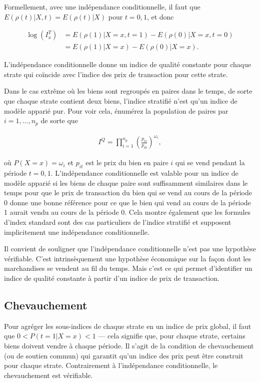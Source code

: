 \documentclass[
]{article}
\begin{document}
Formellement, avec une indépendance conditionnelle, il faut que \(E(\rho(t) | X, t) = E(\rho(t) | X)\) pour \(t = 0,1\), et donc

\begin{align*}
\log (I^{T}_{x}) &= E(\rho(1) | X = x, t = 1) - E(\rho(0) | X = x, t = 0) \\
 &= E(\rho(1) | X = x) - E(\rho(0) | X = x).
\end{align*}

L'indépendance conditionnelle donne un indice de qualité constante pour chaque strate qui coïncide avec l'indice des prix de transaction pour cette strate.

Dans le cas extrême où les biens sont regroupés en paires dans le temps, de sorte que chaque strate contient deux biens, l'indice stratifié n'est qu'un indice de modèle apparié pur. Pour voir cela, énumérez la population de paires par \(i = 1, \ldots, n_{p}\) de sorte que

\begin{align*}
I^{Q} = \prod_{i = 1}^{n_{p}} \left(\frac{p_{i1}}{p_{i0}} \right)^{\omega_{i}},
\end{align*}

où \(P(X = x) = \omega_{i}\) et \(p_{it}\) est le prix du bien en paire \(i\) qui se vend pendant la période \(t = 0,1\). L'indépendance conditionnelle est valable pour un indice de modèle apparié si les biens de chaque paire sont suffisamment similaires dans le temps pour que le prix de transaction du bien qui se vend au cours de la période 0 donne une bonne référence pour ce que le bien qui vend au cours de la période 1 aurait vendu au cours de la période 0. Cela montre également que les formules d'index standard sont des cas particuliers de l'indice stratifié et supposent implicitement une indépendance conditionnelle.

Il convient de souligner que l'indépendance conditionnelle n'est pas une hypothèse vérifiable. C'est intrinsèquement une hypothèse économique sur la façon dont les marchandises se vendent au fil du temps. Mais c'est ce qui permet d'identifier un indice de qualité constante à partir d'un indice de prix de transaction.

\hypertarget{chevauchement}{%
\subsection{Chevauchement}\label{chevauchement}}

Pour agréger les sous-indices de chaque strate en un indice de prix global, il faut que \(0 <P (t = 1 | X = x) <1\) --- cela signifie que, pour chaque strate, certains biens doivent vendre à chaque période. Il s'agit de la condition de chevauchement (ou de soutien commun) qui garantit qu'un indice des prix peut être construit pour chaque strate. Contrairement à l'indépendance conditionnelle, le chevauchement est vérifiable.
\end{document}
